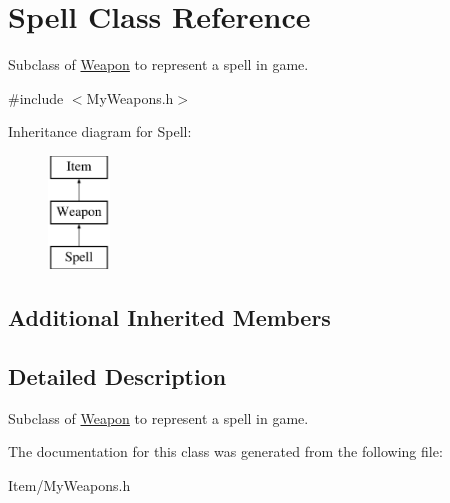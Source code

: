 \hypertarget{classSpell}{\section{Spell Class Reference}
\label{classSpell}
}


Subclass of \hyperlink{classWeapon}{Weapon} to represent a spell in game.  




{\ttfamily \#include $<$My\-Weapons.\-h$>$}

Inheritance diagram for Spell\-:\begin{figure}[H]
\begin{center}
\leavevmode
\includegraphics[height=3.000000cm]{classSpell}
\end{center}
\end{figure}
\subsection*{Additional Inherited Members}


\subsection{Detailed Description}
Subclass of \hyperlink{classWeapon}{Weapon} to represent a spell in game. 

The documentation for this class was generated from the following file\-:\begin{DoxyCompactItemize}
\item 
Item/My\-Weapons.\-h\end{DoxyCompactItemize}

